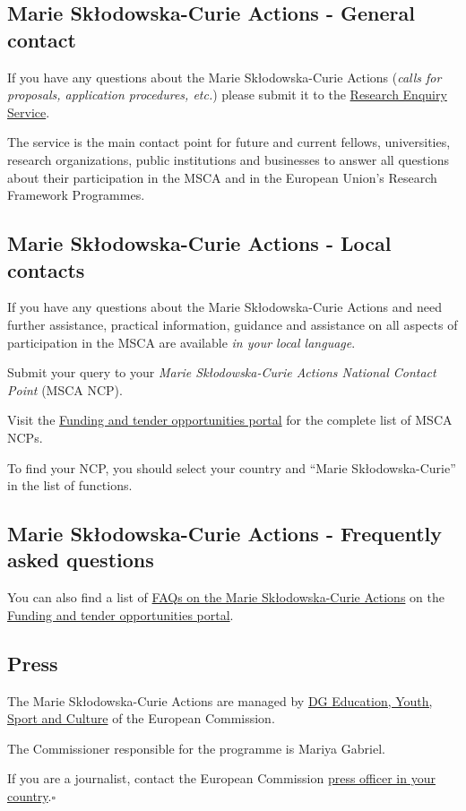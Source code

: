 \documentclass[oneside]{book}
\numberwithin{equation}{section}
\begin{document}
\subsection{Marie Skłodowska-Curie Actions - General contact}
If you have any questions about the Marie Skłodowska-Curie Actions (\textit{calls for proposals, application procedures, etc.}) please submit it to the \href{http://ec.europa.eu/info/research-and-innovation/contact/research-enquiry-service-and-participant-validation_en}{Research Enquiry Service}.

%
The service is the main contact point for future and current fellows, universities, research organizations, public institutions and businesses to answer all questions about their participation in the MSCA and in the European Union's Research Framework Programmes.

\subsection{Marie Skłodowska-Curie Actions - Local contacts}
If you have any questions about the Marie Skłodowska-Curie Actions and need further assistance, practical information, guidance and assistance on all aspects of participation in the MSCA are available \textit{in your local language}.

Submit your query to your \textit{Marie Skłodowska-Curie Actions National Contact Point} (MSCA NCP).

%
Visit the \href{https://ec.europa.eu/info/funding-tenders/opportunities/portal/screen/support/ncp}{Funding and tender opportunities portal} for the complete list of MSCA NCPs.

To find your NCP, you should select your country and ``Marie Skłodowska-Curie'' in the list of functions.

\subsection{Marie Skłodowska-Curie Actions - Frequently asked questions}
You can also find a list of \href{https://ec.europa.eu/info/funding-tenders/opportunities/portal/screen/support/faq}{FAQs on the Marie Skłodowska-Curie Actions} on the \href{https://ec.europa.eu/info/funding-tenders/opportunities/portal/screen/home}{Funding and tender opportunities portal}.

\subsection{Press}
The Marie Skłodowska-Curie Actions are managed by \href{https://ec.europa.eu/info/departments/education-youth-sport-and-culture\_en}{DG Education, Youth, Sport and Culture} of the European Commission.

The Commissioner responsible for the programme is Mariya Gabriel.

%
If you are a journalist, contact the European Commission \href{https://ec.europa.eu/info/about-european-commission/contact/press-services/press-contacts/press-contacts-eu-countries_en}{press officer in your country}.\hfill$\square$


\printbibliography[heading=bibintoc]
\end{document}
